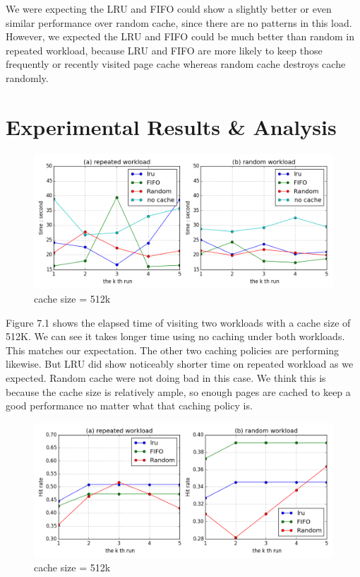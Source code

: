 \documentclass[paper=a4, fontsize=11pt]{scrartcl} %
\numberwithin{equation}{section} %
\numberwithin{figure}{section} %
\numberwithin{table}{section} %
\begin{document}
We were expecting the LRU and FIFO could show a slightly better or even similar performance over random cache, since there are no patterns in this load. However, we expected the LRU and FIFO could be much better than random in repeated workload, because LRU and FIFO are more likely to keep those frequently or recently visited page cache whereas random cache destroys cache randomly. 

\section{Experimental Results \& Analysis}
\begin{figure}[h]
  \centering
  \includegraphics[width=\textwidth]{../data/time512k}
  \caption{cache size = 512k}
  \label{fig:time512k}
\end{figure}
Figure 7.1 shows the elapsed time of visiting two workloads with a cache size of 512K. We can see it takes longer time using no caching under both workloads. This matches our expectation. The other two caching policies are performing likewise. But LRU did show noticeably shorter time on repeated workload as we expected. Random cache were not doing bad in this case. We think this is because the cache size is relatively ample, so enough pages are cached to keep a good performance no matter what that caching policy is. 
\begin{figure}[h]
  \centering
  \includegraphics[width=\textwidth]{../data/hit512k}
  \caption{cache size = 512k}
  \label{fig:hit512k}
\end{figure}
\end{document}
